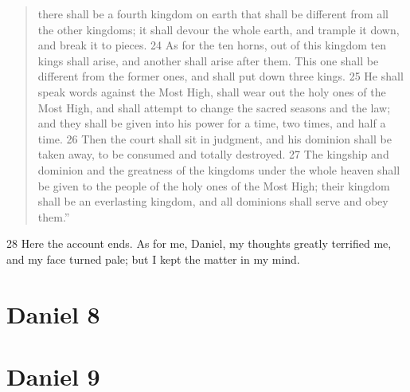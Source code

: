 \begin{verse}
there shall be a fourth kingdom on earth
    that shall be different from all the other kingdoms;
it shall devour the whole earth,
    and trample it down, and break it to pieces.
24 As for the ten horns,
out of this kingdom ten kings shall arise,
    and another shall arise after them.
This one shall be different from the former ones,
    and shall put down three kings.
25 He shall speak words against the Most High,
    shall wear out the holy ones of the Most High,
    and shall attempt to change the sacred seasons and the law;
and they shall be given into his power
    for a time, two times, and half a time.
26 Then the court shall sit in judgment,
    and his dominion shall be taken away,
    to be consumed and totally destroyed.
27 The kingship and dominion
    and the greatness of the kingdoms under the whole heaven
    shall be given to the people of the holy ones of the Most High;
their kingdom shall be an everlasting kingdom,
    and all dominions shall serve and obey them.''
\end{verse}

28 Here the account ends. As for me, Daniel, my thoughts greatly terrified me, 
and my face turned pale; but I kept the matter in my mind.

\section{Daniel 8}

\section{Daniel 9}

